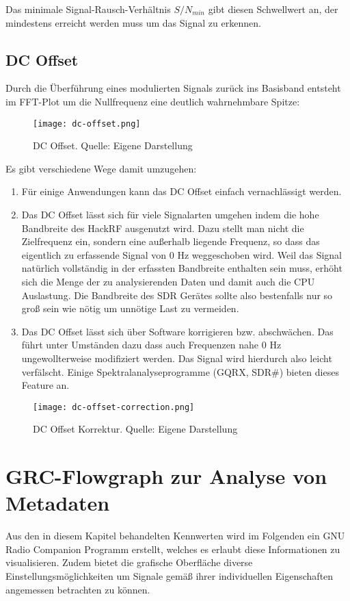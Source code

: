 Das minimale Signal-Rausch-Verhältnis \(S/N_{min}\) gibt diesen Schwellwert an, der mindestens erreicht werden muss um das Signal zu erkennen. 

\subsection{DC Offset}
Durch die Überführung eines modulierten Signals zurück ins Basisband entsteht im FFT-Plot um die Nullfrequenz eine deutlich wahrnehmbare Spitze:
\begin{figure}[ht]
	\centering
	\texttt{[image: dc-offset.png]}
	\caption[DC Offset]{DC Offset. Quelle: Eigene Darstellung} 
	\label{dc-offset}
\end{figure}

Es gibt verschiedene Wege damit umzugehen:
\begin{enumerate}
	\item Für einige Anwendungen kann das DC Offset einfach vernachlässigt werden.
	\item Das DC Offset lässt sich für viele Signalarten umgehen indem die hohe Bandbreite des HackRF ausgenutzt wird. 
	Dazu stellt man nicht die Zielfrequenz ein, sondern eine außerhalb liegende Frequenz, so dass das eigentlich zu erfassende Signal von 0 Hz  weggeschoben wird. Weil das Signal natürlich vollständig in der erfassten Bandbreite enthalten sein muss, erhöht sich die Menge der zu analysierenden Daten und damit auch die CPU Auslastung. Die Bandbreite des SDR Gerätes sollte also bestenfalls nur so groß sein wie nötig um unnötige Last zu vermeiden.
	\item Das DC Offset lässt sich über Software korrigieren bzw. abschwächen. Das führt unter Umständen dazu dass auch Frequenzen nahe 0 Hz ungewollterweise modifiziert werden. Das Signal wird hierdurch also leicht verfälscht. Einige Spektralanalyseprogramme (GQRX, SDR\#) bieten dieses Feature an.
\end{enumerate}

\begin{figure}[ht]
	\centering
	\texttt{[image: dc-offset-correction.png]}
	\caption[DC Offset Korrektur]{DC Offset Korrektur. Quelle: Eigene Darstellung} 
	\label{dc-offset-correction}
\end{figure}


\newpage
\section{GRC-Flowgraph zur Analyse von Metadaten}
Aus den in diesem Kapitel behandelten Kennwerten wird im Folgenden ein GNU Radio Companion Programm erstellt, welches es erlaubt diese Informationen zu visualisieren. Zudem bietet die grafische Oberfläche diverse Einstellungsmöglichkeiten um Signale gemäß ihrer individuellen Eigenschaften angemessen betrachten zu können.

